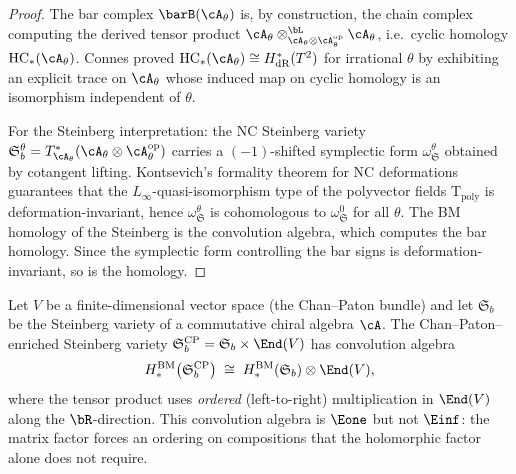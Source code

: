 \begin{proof}
The bar complex $\barB(\cA_\theta)$ is, by construction, the chain complex
computing the derived tensor product
$\cA_\theta \otimes_{\cA_\theta \otimes \cA_\theta^{\mathrm{op}}}^{\bL}
\cA_\theta$, i.e.\ cyclic homology $\HC_*(\cA_\theta)$.
Connes proved $\HC_*(\cA_\theta) \cong H^*_\dR(T^2)$ for irrational $\theta$
by exhibiting an explicit trace on $\cA_\theta$ whose induced map on cyclic
homology is an isomorphism independent of $\theta$.

For the Steinberg interpretation: the NC Steinberg variety
$\mathfrak{S}_b^\theta = T^*_{\cA_\theta} (\cA_\theta \otimes
\cA_\theta^{\mathrm{op}})$ carries a $(-1)$-shifted symplectic form
$\omega_{\mathfrak{S}}^\theta$ obtained by cotangent lifting.
Kontsevich's formality theorem for NC deformations guarantees
that the $L_\infty$-quasi-isomorphism type of the polyvector fields
$\mathrm{T}_{\mathrm{poly}}$ is deformation-invariant,
hence $\omega_{\mathfrak{S}}^\theta$ is cohomologous to
$\omega_{\mathfrak{S}}^0$ for all $\theta$.
The BM homology of the Steinberg is the convolution algebra, which computes
the bar homology. Since the symplectic form controlling the bar signs
is deformation-invariant, so is the homology.
\end{proof}

\begin{proposition}
\label{prop:chan-paton-breaking}
Let $V$ be a finite-dimensional vector space (the Chan--Paton bundle) and let
$\mathfrak{S}_b$ be the Steinberg variety of a commutative chiral algebra
$\cA$. The Chan--Paton--enriched Steinberg variety
$\mathfrak{S}_b^{\mathrm{CP}} = \mathfrak{S}_b \times \End(V)$
has convolution algebra
\[
 H_*^\BM\bigl(\mathfrak{S}_b^{\mathrm{CP}}\bigr)
 \;\cong\;
 H_*^\BM(\mathfrak{S}_b) \otimes \End(V),
\]
where the tensor product uses \emph{ordered} (left-to-right) multiplication
in $\End(V)$ along the $\bR$-direction. This convolution algebra is $\Eone$
but not $\Einf$: the matrix factor forces an ordering on compositions that
the holomorphic factor alone does not require.
\end{proposition}

